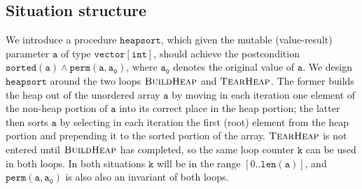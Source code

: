 \documentclass[english,submission]{eptcs}
\begin{document}
\subsection{Situation structure}

We introduce a procedure $\mathtt{heapsort}$, which given the mutable
(value-result) parameter $\mathtt{a}$ of type $\mathtt{vector[int]}$,
should achieve the postcondition $\mathtt{sorted(a)\land perm(a,a_{0})}$,
where $\mathtt{a_{0}}$ denotes the original value of $\mathtt{a}$.
We design $\mathtt{heapsort}$ around the two loops $\textsc{BuildHeap}$
and $\textsc{TearHeap}$. The former builds the heap out of the unordered
array $\mathtt{a}$ by moving in each iteration one element of the
non-heap portion of $\mathtt{a}$ into its correct place in the heap
portion; the latter then sorts $\mathtt{a}$ by selecting in each
iteration the first (root) element from the heap portion and prepending
it to the sorted portion of the array. $\textsc{TearHeap}$ is not
entered until $\textsc{BuildHeap}$ has completed, so the same loop
counter $\mathtt{k}$ can be used in both loops. In both situations
$\mathtt{k}$ will be in the range $[0..\mathtt{len(a)}]$, and $\mathtt{perm(a,a_{0})}$
is also also an invariant of both loops. 
\end{document}
